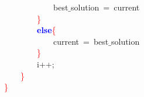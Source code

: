 \mbox{}\ \ \ \ \ \ \ \ \ \ \ \ best$\_$solution\ \textcolor{BrickRed}{=}\ current \\
\mbox{}\ \ \ \ \ \ \ \ \textcolor{Red}{\}} \\
\mbox{}\ \ \ \ \ \ \ \ \textbf{\textcolor{Blue}{else}}\textcolor{Red}{\{} \\
\mbox{}\ \ \ \ \ \ \ \ \ \ \ \ current\ \textcolor{BrickRed}{=}\ best$\_$solution \\
\mbox{}\ \ \ \ \ \ \ \ \textcolor{Red}{\}} \\
\mbox{}\ \ \ \ \ \ \ \ i\textcolor{BrickRed}{++;} \\
\mbox{}\ \ \ \ \textcolor{Red}{\}} \\
\mbox{}\textcolor{Red}{\}} \\
\mbox{}
